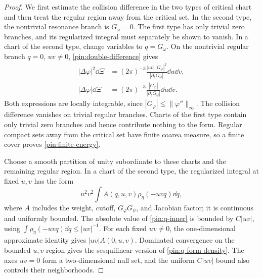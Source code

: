 \begin{proof}
We first estimate the collision difference in the two types of critical
chart and then treat the regular region away from the critical set.
In the second type, the nontrivial resonance branch is $G_\omega=0$.
The first type has only trivial zero branches, and its regularized
integral must separately be shown to vanish.
In a chart of the second type, change variables to $q=G_\omega$.
On the nontrivial regular branch $q=0$, $uv\ne0$,
\eqref{pin:double-difference} gives
\begin{align}
 |\Delta\varphi|^2\dd\Xi
   &=(2\pi)^{-3}
      \frac{|uv|\,|G_\varphi|^2}{|\partial_zG_\omega|}\dd u\dd v,
 \label{pin:q-form-density}\\
 |\Delta\varphi|\dd\Xi
   &=(2\pi)^{-3}
      \frac{|G_\varphi|}{|\partial_zG_\omega|}\dd u\dd v.
 \label{pin:q-linear-density}
\end{align}
Both expressions are locally integrable, since
$|G_\varphi|\le\|\varphi''\|_\infty$. The collision difference
vanishes on trivial regular branches. Charts of the first type contain
only trivial zero branches and hence contribute nothing to the form.
Regular compact sets away from the critical set have finite coarea
measure, so a finite cover proves \eqref{pin:finite-energy}.

Choose a smooth partition of unity subordinate to these charts and the
remaining regular region. In a chart of the second type, the
regularized integral at fixed $u,v$ has the form
\begin{equation}
             u^2v^2\int A(q,u,v)\rho_\eta(-uvq)\dd q,
 \label{pin:q-inner}
\end{equation}
where $A$ includes the weight, cutoff,
$G_\varphi\overline{G_\psi}$, and Jacobian factor; it is continuous
and uniformly bounded. The absolute value of \eqref{pin:q-inner} is
bounded by $C|uv|$, using
$\int\rho_\eta(-uvq)\dd q\le |uv|^{-1}$. For each fixed
$uv\ne0$, the one-dimensional approximate identity gives
$|uv|A(0,u,v)$. Dominated convergence on the bounded $u,v$ region
gives the sesquilinear version of \eqref{pin:q-form-density}.
The axes $uv=0$ form a two-dimensional null set, and the uniform
$C|uv|$ bound also controls their neighborhoods.


\end{proof}
